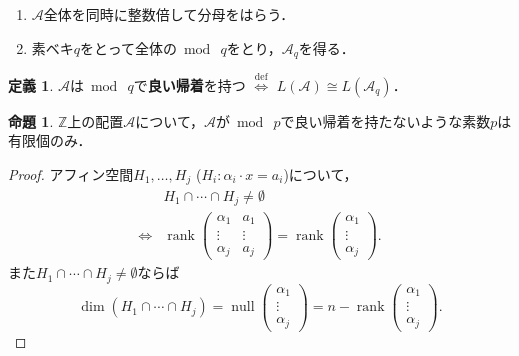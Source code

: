 \documentclass[xelatex,ja=standard,a4paper,14pt,everyparhook=compat]{bxjsarticle}
\newcommand{\bbZ}{\mathbb{Z}}
\newcommand{\mcA}{\mathcal{A}}
\newcommand{\umod}{{\bmod\:}}
\DeclareMathOperator{\rank}{rank}
\DeclareMathOperator{\nullity}{null}
\theoremstyle{definition}
\newtheorem{definition}[theorem]{定義}
\newtheorem{proposition}[theorem]{命題}
\begin{document}
\begin{enumerate}[label=(\arabic*)]
    \item $\mcA$全体を同時に整数倍して分母をはらう．
    \item 素ベキ$q$をとって全体の$\umod q$をとり，$\mcA_q$を得る．
\end{enumerate}

\begin{definition}
    $\mcA$は$\umod q$で\textbf{良い帰着}を持つ $\overset{\mathrm{def}}{\iff}$ $L(\mcA) \cong L(\mcA_q)$．
\end{definition}

\begin{proposition}
    $\bbZ$上の配置$\mcA$について，$\mcA$が$\umod p$で良い帰着を持たないような素数$p$は有限個のみ．
\end{proposition}
\begin{proof}
    アフィン空間$H_1,\ldots,H_j$ ($H_i : \alpha_i \cdot x = a_i$)について， \begin{align*}
               & H_1 \cap \cdots \cap H_j \neq \emptyset                             \\
        \iff{} & \rank\begin{pmatrix}
            \alpha_1 & a_1    \\
            \vdots   & \vdots \\
            \alpha_j & a_j
        \end{pmatrix} = \rank \begin{pmatrix}
            \alpha_1 \\
            \vdots   \\
            \alpha_j
        \end{pmatrix}.
    \end{align*}
    また$H_1 \cap \cdots \cap H_j \neq \emptyset$ならば \begin{equation*}
        \dim(H_1 \cap \cdots \cap H_j) = \nullity \begin{pmatrix}
            \alpha_1 \\
            \vdots   \\
            \alpha_j
        \end{pmatrix} = n - \rank \begin{pmatrix}
            \alpha_1 \\
            \vdots   \\
            \alpha_j
        \end{pmatrix}.
    \end{equation*}

\end{proof}
\end{document}
